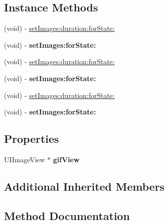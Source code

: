 \subsection*{Instance Methods}
\begin{DoxyCompactItemize}
\item 
(void) -\/ \mbox{\hyperlink{interface_m_j_refresh_gif_header_a7e3e5adcc0096efd42868e99a54a068e}{set\+Images\+:duration\+:for\+State\+:}}
\item 
\mbox{\label{interface_m_j_refresh_gif_header_ad1f3f6278621a26dd42a8e422e881a7d}} 
(void) -\/ {\bfseries set\+Images\+:for\+State\+:}
\item 
(void) -\/ \mbox{\hyperlink{interface_m_j_refresh_gif_header_a7e3e5adcc0096efd42868e99a54a068e}{set\+Images\+:duration\+:for\+State\+:}}
\item 
\mbox{\label{interface_m_j_refresh_gif_header_ad1f3f6278621a26dd42a8e422e881a7d}} 
(void) -\/ {\bfseries set\+Images\+:for\+State\+:}
\item 
(void) -\/ \mbox{\hyperlink{interface_m_j_refresh_gif_header_a7e3e5adcc0096efd42868e99a54a068e}{set\+Images\+:duration\+:for\+State\+:}}
\item 
\mbox{\label{interface_m_j_refresh_gif_header_ad1f3f6278621a26dd42a8e422e881a7d}} 
(void) -\/ {\bfseries set\+Images\+:for\+State\+:}
\end{DoxyCompactItemize}
\subsection*{Properties}
\begin{DoxyCompactItemize}
\item 
\mbox{\label{interface_m_j_refresh_gif_header_a32007e3fdb40ce4a68fba50af4e4ec6d}} 
U\+I\+Image\+View $\ast$ {\bfseries gif\+View}
\end{DoxyCompactItemize}
\subsection*{Additional Inherited Members}


\subsection{Method Documentation}
\mbox{\label{interface_m_j_refresh_gif_header_a7e3e5adcc0096efd42868e99a54a068e}} 
